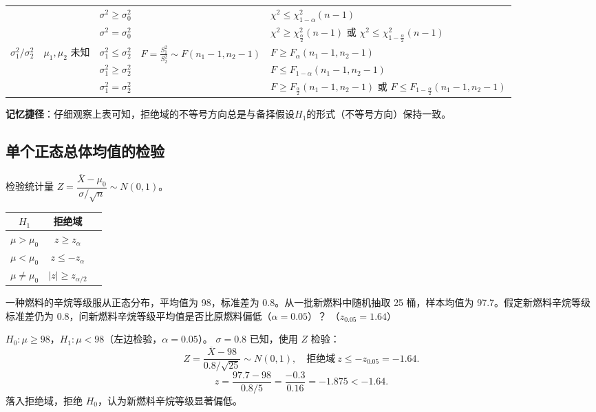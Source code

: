\documentclass[lang=cn,11pt]{elegantbook}
\begin{document}
\begin{table}[htbp]
{\begin{tabular}{lllll}
& & $\sigma^2 \geq \sigma_0^2$ & & $\chi^2 \leq \chi^2_{1-\alpha}(n-1)$ \\
& & $\sigma^2 = \sigma_0^2$ & & $\chi^2 \geq \chi^2_{\frac{\alpha}{2}}(n-1)$ 或 $\chi^2 \leq \chi^2_{1-\frac{\alpha}{2}}(n-1)$ \\
\midrule
\multirow{3}{*}{$\sigma_1^2 / \sigma_2^2$} & \multirow{3}{*}{$\mu_1,\mu_2$ 未知} & $\sigma_1^2 \leq \sigma_2^2$ & \multirow{3}{*}{$F = \frac{S_1^2}{S_2^2} \sim F(n_1-1,n_2-1)$} & $F \geq F_\alpha(n_1-1,n_2-1)$ \\
& & $\sigma_1^2 \geq \sigma_2^2$ & & $F \leq F_{1-\alpha}(n_1-1,n_2-1)$ \\
& & $\sigma_1^2 = \sigma_2^2$ & & $F \geq F_{\frac{\alpha}{2}}(n_1-1,n_2-1)$ 或 $F \leq F_{1-\frac{\alpha}{2}}(n_1-1,n_2-1)$ \\
\bottomrule
\end{tabular}
}
\end{table}
\begin{remark} \label{rem:rejection_region}
\textbf{记忆捷径}：仔细观察上表可知，拒绝域的不等号方向总是与备择假设$H_1$的形式（不等号方向）保持一致。
\end{remark}

\subsection{单个正态总体均值的检验}

\begin{property}[Z 检验（\(\sigma^2\) 已知）]\label{prop:z-test}
检验统计量 \(Z = \dfrac{\overline{X}-\mu_0}{\sigma/\sqrt{n}} \sim N(0,1)\)。

\begin{center}
\begin{tabular}{ccc}
\toprule
\(H_1\) & 拒绝域 \\
\midrule
\(\mu > \mu_0\) & \(z \geq z_\alpha\) \\[4pt]
\(\mu < \mu_0\) & \(z \leq -z_\alpha\) \\[4pt]
\(\mu \neq \mu_0\) & \(|z| \geq z_{\alpha/2}\) \\
\bottomrule
\end{tabular}
\end{center}
\end{property}

\begin{exercise} \label{ex:ht_z_left}
一种燃料的辛烷等级服从正态分布，平均值为 98，标准差为 0.8。从一批新燃料中随机抽取 25 桶，样本均值为 97.7。假定新燃料辛烷等级标准差仍为 0.8，问新燃料辛烷等级平均值是否比原燃料偏低（\(\alpha=0.05\)）？
（\(z_{0.05}=1.64\)）
\end{exercise}
\begin{solution}
\(H_0\colon\mu\geq98\)，\(H_1\colon\mu<98\)（左边检验，\(\alpha=0.05\)）。
\(\sigma=0.8\) 已知，使用 \(Z\) 检验：
\[
Z=\frac{\overline{X}-98}{0.8/\sqrt{25}}\sim N(0,1),\quad\text{拒绝域}\ z\leq -z_{0.05}=-1.64.
\]
\[
z=\frac{97.7-98}{0.8/5}=\frac{-0.3}{0.16}=-1.875<-1.64.
\]
落入拒绝域，拒绝 \(H_0\)，认为新燃料辛烷等级显著偏低。
\end{solution}
\end{document}
